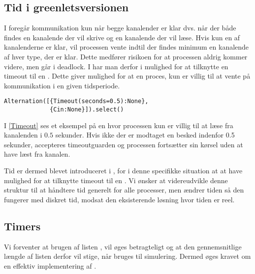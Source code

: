 
\subsection{Tid i greenletsversionen} 
I \pycsp foregår kommunikation
kun når begge kanalender er klar dvs. når der både findes en
kanalende der vil skrive og en kanalende der vil læse. Hvis
kun en af kanalenderne er klar, vil processen vente indtil der findes
minimum en kanalende af hver type, der er klar. Dette medfører
risikoen for at processen aldrig kommer videre, men går i deadlock.
I \pycsp har man derfor i  mulighed for at
tilknytte en timeout til en . Dette giver mulighed for
at en proces, kun er villig til at vente på kommunikation i en
given tidsperiode. 
\begin{lstlisting}[float=hbtp, label=Timeout,caption=Timeout i Alternation (fra dokumentationen til PyCSP)]
Alternation([{Timeout(seconds=0.5):None}, 
             {Cin:None}]).select()
\end{lstlisting}

I \cref{Timeout} ses et eksempel på en  hvor processen kun er villig
til at læse fra kanalenden  i $0.5$ sekunder. Hvis ikke der
er modtaget en besked indenfor 0.5 sekunder, accepteres timeoutguarden
og processen fortsætter sin kørsel uden at have læst fra kanalen.

Tid er dermed blevet introduceret i \pycsp, for i denne specifikke situation at at have
mulighed for at tilknytte timeout til en . Vi ønsker
at videreudvikle denne struktur til at håndtere tid generelt for alle
processer, men ændrer tiden så den fungerer med diskret tid, modsat den eksisterende
løsning hvor tiden er reel.

\subsection{Timers}  
Vi forventer at brugen af
listen , vil øges betragteligt og at den gennemsnitlige
længde af listen derfor vil stige, når \pycsp bruges til simulering. Dermed 
øges kravet om en effektiv implementering af . 

